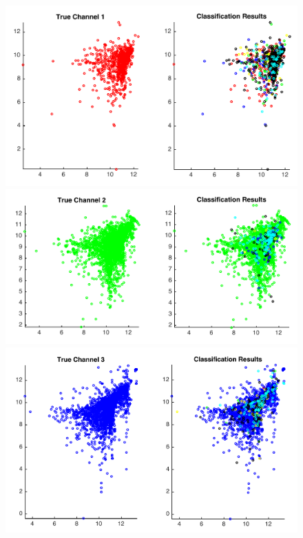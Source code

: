 \documentclass{article} %
\begin{document}
\begin{figure}[h!]
\centering
 \includegraphics[scale = 0.4]{scoreFig1.pdf}\hspace{0.5cm}
 \includegraphics[scale = 0.4]{scoreFig2.pdf}
 \includegraphics[scale = 0.4]{scoreFig3.pdf}\hspace{0.5cm}

\end{figure}
\end{document}
